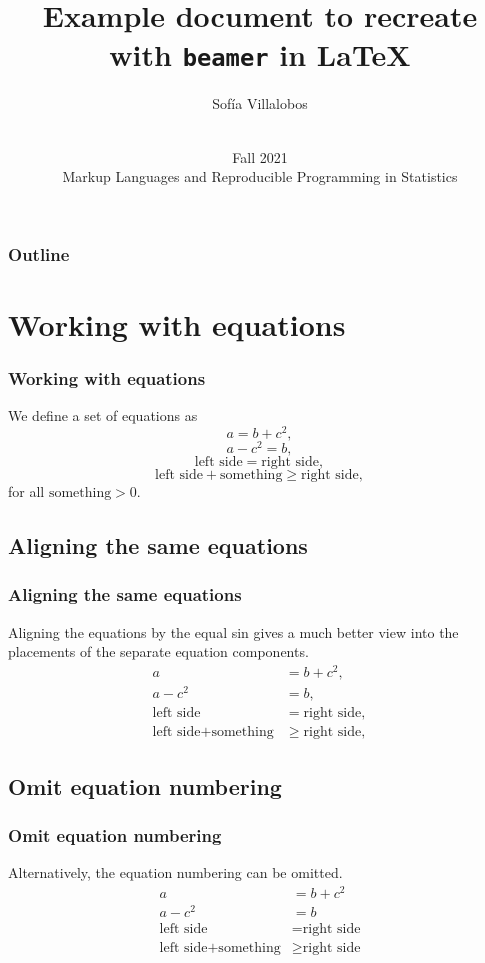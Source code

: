 \documentclass{beamer}
\title[Example] {Example document to recreate with \texttt{beamer} in \LaTeX}
\author
{Sofía Villalobos}
\date
{\vspace{.5 in}\\ Fall 2021 \\ Markup Languages and Reproducible Programming in Statistics  \vskip6mm}
\begin{document}
\titlepage

\begin{frame}
\frametitle{Outline}
\tableofcontents
\end{frame}

\section{Working with equations}
\begin{frame}
\frametitle{Working with equations}
    We define a set of equations as
    \begin{equation}
        a=b+c^2,
    \end{equation}
    \begin{equation}
    	a-c^2=b,
    \end{equation}
    \begin{equation}
    	\text{left side} = \text{right side},
    \end{equation}
    \begin{equation}
    	\text{left side} + \text{something} \geq \text{right side},
    \end{equation}
    for all $\text{something} > 0$. 
\end{frame}

\subsection{Aligning the same equations}
\begin{frame}
\frametitle{Aligning the same equations}
    Aligning the equations by the equal sin gives a much better view into the placements of the separate equation components. 
    \begin{align}
    	a&=b+c^2,\\
    	a-c^2&=b,\\
    	\text{left side} &= \text{right side},\\
    	\text{left side} + \text{something} & \geq \text{right side},
    \end{align}
\end{frame}

\subsection{Omit equation numbering}
\begin{frame}
\frametitle{Omit equation numbering}
    Alternatively, the equation numbering can be omitted. 
    \begin{align*}
    	a&=b+c^2\\
    	a-c^2&=b\\
    	\text{left side} &= \text{right side}\\
    	\text{left side} + \text{something} & \geq \text{right side}
    \end{align*}
\end{frame}
\end{document}
